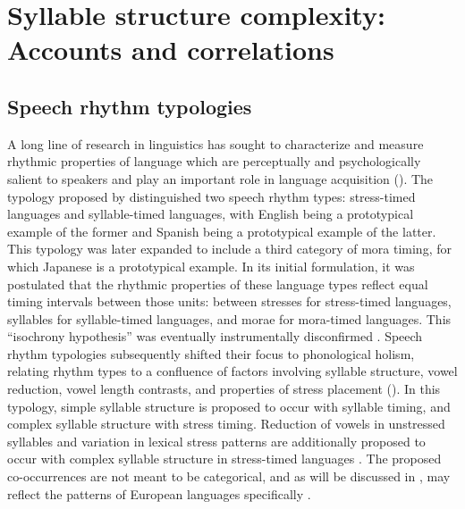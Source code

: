 \section{Syllable structure complexity: Accounts and correlations}\label{sec:1.3}
\subsection{Speech rhythm typologies}\label{sec:1.3.1}

  A long line of research in linguistics has sought to characterize and measure rhythmic properties of language which are perceptually and psychologically sa\-lient to speakers and play an important role in language acquisition (\citealt{CutlerMehler1993}). The typology proposed by \citet{Pike1945} distinguished two speech rhythm types: stress-timed languages and syllable-timed languages, with English being a prototypical example of the former and Spanish being a prototypical example of the latter. This typology was later expanded to include a third category of mora timing, for which Japanese is a prototypical example. In its initial formulation, it was postulated that the rhythmic properties of these language types reflect equal timing intervals between those units: between stresses for stress-timed languages, syllables for syllable-timed languages, and morae for mora-timed languages. This ``isochrony hypothesis'' was eventually instrumentally disconfirmed \citep{Roach1982}. Speech rhythm typologies subsequently shifted their  focus to phonological holism, relating rhythm types to a confluence of factors involving syllable structure, vowel reduction, vowel length contrasts, and properties of stress placement (\citealt{Roach1982,Dauer1983}). In this typology, simple syllable structure is proposed to occur with syllable timing, and complex syllable structure with stress timing. Reduction of vowels in unstressed syllables and variation in lexical stress patterns are additionally proposed to occur with complex syllable structure in stress-timed languages \citep{Auer1993}. The proposed co-occurrences are not meant to be categorical, and as will be discussed in , may reflect the patterns of European languages specifically \citep{Schiering2007}.

